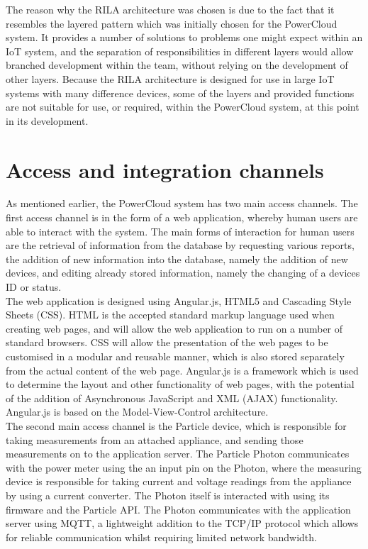 \documentclass{article}
\begin{document}
	The reason why the RILA architecture was chosen is due to the fact 
	that it resembles the layered pattern which was initially chosen for 
	the PowerCloud system. It provides a number of solutions to problems 
	one might expect within an IoT system, and the separation of 
	responsibilities in different layers would allow branched development 
	within the team, without relying on the development of other layers. 
	Because the RILA architecture is designed for use in large IoT 
	systems with many difference devices, some of the layers and provided 
	functions are not suitable for use, or required, within the 
	PowerCloud system, at this point in its development.

\section{Access and integration channels}
	
	As mentioned earlier, the PowerCloud system has two main access 
	channels. The first access channel is in the form of a web 
	application, whereby human users are able to interact with the 
	system. The main forms of interaction for human users are the 
	retrieval of information from the database by requesting various 
	reports, the addition of new information into the database, namely 
	the addition of new devices, and editing already stored information, 
	namely the changing of a devices ID or status.\\
	
	The web application is designed using Angular.js, HTML5 and Cascading 
	Style Sheets (CSS). HTML is the accepted standard markup language 
	used when creating web pages, and will allow the web application to 
	run on a number of standard browsers. CSS will allow the presentation 
	of the web pages to be customised in a modular and reusable manner, 
	which is also stored separately from the actual content of the web 
	page. Angular.js is a framework which is used to determine the layout 
	and other functionality of web pages, with the potential of the 
	addition of Asynchronous JavaScript and XML (AJAX) functionality. 
	Angular.js is based on the Model-View-Control architecture.\\
	
	The second main access channel is the Particle device, which is 
	responsible for taking measurements from an attached appliance, and 
	sending those measurements on to the application server. The Particle 
	Photon communicates with the power meter using the an input pin on the Photon, 
	where the measuring device is responsible for taking current and 
	voltage readings from the appliance by using a current converter. The 
	Photon itself is interacted with using its firmware and the Particle 
	API. The Photon communicates with the application server using MQTT, 
	a lightweight addition to the TCP/IP protocol which allows for 
	reliable communication whilst requiring limited network bandwidth.\\
	
\end{document}
